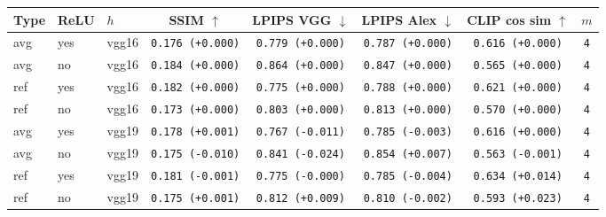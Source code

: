 \begin{tabular}{|l|l|l|c|c|c|c|c|}
\hline
Type & ReLU & $h$ & SSIM $\uparrow$ & LPIPS VGG $\downarrow$ & LPIPS Alex $\downarrow$ & CLIP cos sim $\uparrow$ & $m$ \\
\hline
\rowcolor{verylightgray}avg & yes & vgg16 & \texttt{0.176 {\color{black}(+0.000)}} & \texttt{0.779 {\color{black}(+0.000)}} & \texttt{0.787 {\color{black}(+0.000)}} & \texttt{0.616 {\color{black}(+0.000)}} & \texttt{4} \\
\rowcolor{verylightgray}avg & no & vgg16 & \texttt{0.184 {\color{black}(+0.000)}} & \texttt{0.864 {\color{black}(+0.000)}} & \texttt{0.847 {\color{black}(+0.000)}} & \texttt{0.565 {\color{black}(+0.000)}} & \texttt{4} \\
\rowcolor{verylightgray}ref & yes & vgg16 & \texttt{0.182 {\color{black}(+0.000)}} & \texttt{0.775 {\color{black}(+0.000)}} & \texttt{0.788 {\color{black}(+0.000)}} & \texttt{0.621 {\color{black}(+0.000)}} & \texttt{4} \\
\rowcolor{verylightgray}ref & no & vgg16 & \texttt{0.173 {\color{black}(+0.000)}} & \texttt{0.803 {\color{black}(+0.000)}} & \texttt{0.813 {\color{black}(+0.000)}} & \texttt{0.570 {\color{black}(+0.000)}} & \texttt{4} \\
\hline
avg & yes & vgg19 & \texttt{0.178 {\color{green}(+0.001)}} & \texttt{0.767 {\color{green}(-0.011)}} & \texttt{0.785 {\color{green}(-0.003)}} & \texttt{0.616 {\color{black}(+0.000)}} & \texttt{4} \\
avg & no & vgg19 & \texttt{0.175 {\color{red}(-0.010)}} & \texttt{0.841 {\color{green}(-0.024)}} & \texttt{0.854 {\color{red}(+0.007)}} & \texttt{0.563 {\color{red}(-0.001)}} & \texttt{4} \\
ref & yes & vgg19 & \texttt{0.181 {\color{red}(-0.001)}} & \texttt{0.775 {\color{black}(-0.000)}} & \texttt{0.785 {\color{green}(-0.004)}} & \texttt{0.634 {\color{green}(+0.014)}} & \texttt{4} \\
ref & no & vgg19 & \texttt{0.175 {\color{green}(+0.001)}} & \texttt{0.812 {\color{red}(+0.009)}} & \texttt{0.810 {\color{green}(-0.002)}} & \texttt{0.593 {\color{green}(+0.023)}} & \texttt{4} \\
\hline
\end{tabular}
